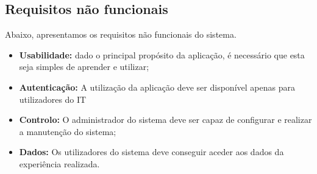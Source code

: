 \newpage

\subsection{Requisitos não funcionais}
Abaixo, apresentamos os requisitos não funcionais do sistema.
\begin{itemize}
    \item \textbf{Usabilidade: } dado o principal propósito da aplicação, é necessário que esta seja simples de aprender e utilizar;
    \item \textbf{Autenticação:} A utilização da aplicação deve ser disponível apenas para utilizadores do IT 
    \item \textbf{Controlo:} O administrador do sistema deve ser capaz de configurar e realizar a manutenção do sistema;
    \item \textbf{Dados:} Os utilizadores do sistema deve conseguir aceder aos dados da experiência realizada.

\end{itemize}